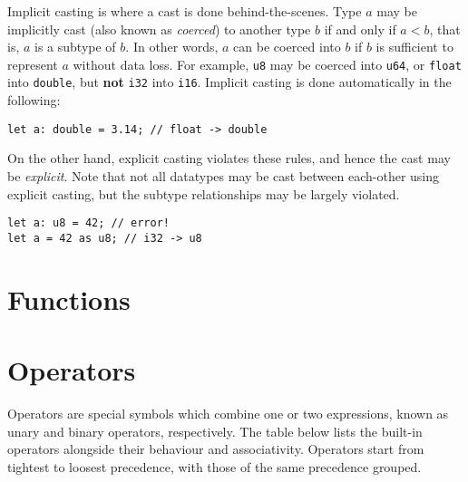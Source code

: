 \documentclass{article}
\begin{document}
    Implicit casting is where a cast is done behind-the-scenes.
    Type \(a\) may be implicitly cast (also known as \textit{coerced}) to another type \(b\) if and only if \(a < b\), that is, \(a\) is a subtype of \(b\).
    In other words, \(a\) can be coerced into \(b\) if \(b\) is sufficient to represent \(a\) without data loss.
    For example, \texttt{u8} may be coerced into \texttt{u64}, or \texttt{float} into \texttt{double}, but \textbf{not} \texttt{i32} into \texttt{i16}.
    Implicit casting is done automatically in the following:

    \begin{lstlisting}[language=CustomLang]
let a: double = 3.14; // float -> double
    \end{lstlisting}

    On the other hand, explicit casting violates these rules, and hence the cast may be \textit{explicit}.
    Note that not all datatypes may be cast between each-other using explicit casting, but the subtype relationships may be largely violated.

    \begin{lstlisting}[language=CustomLang]
let a: u8 = 42; // error!
let a = 42 as u8; // i32 -> u8
    \end{lstlisting}

    \section{Functions}

    \section{Operators}

    Operators are special symbols which combine one or two expressions, known as unary and binary operators, respectively.
    The table below lists the built-in operators alongside their behaviour and associativity.
    Operators start from tightest to loosest precedence, with those of the same precedence grouped.
\end{document}
